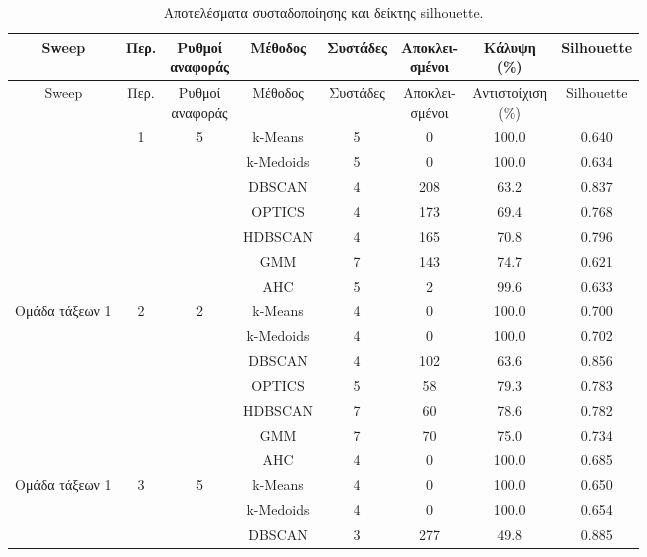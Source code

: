\begingroup
\small
\setlength{\tabcolsep}{3pt}
\setlength{\LTleft}{\fill}
\setlength{\LTright}{\fill}
\begin{longtable}{cccccccc}
\caption{Αποτελέσματα συσταδοποίησης και δείκτης silhouette.}\label{tab:amb:cohesion-coverage}\\
\toprule
Sweep & Περ. & \makecell{Ρυθμοί\\αναφοράς} & Μέθοδος & Συστάδες & \makecell{Αποκλει-\\σμένοι} & \makecell{Κάλυψη\\(\%)} & Silhouette \\
\midrule
\endfirsthead
\toprule
Sweep & Περ. & \makecell{Ρυθμοί\\αναφοράς} & Μέθοδος & Συστάδες & \makecell{Αποκλει-\\σμένοι} & \makecell{Αντιστοίχιση\\(\%)} & Silhouette \\
\midrule
\endhead
\endfoot
\bottomrule
\endlastfoot
\multirow{7}{*}{Ομάδα τάξεων 1} & \multirow{7}{*}{1} & \multirow{7}{*}{5} & k-Means & 5 & 0 & 100.0 & 0.640 \\*
& & & k-Medoids & 5 & 0 & 100.0 & 0.634 \\*
& & & DBSCAN & 4 & 208 & 63.2 & 0.837 \\*
& & & OPTICS & 4 & 173 & 69.4 & 0.768 \\*
& & & HDBSCAN & 4 & 165 & 70.8 & 0.796 \\*
& & & GMM & 7 & 143 & 74.7 & 0.621 \\*
& & & AHC & 5 & 2 & 99.6 & 0.633 \\
\midrule
\multirow{7}{*}{Ομάδα τάξεων 1} & \multirow{7}{*}{2} & \multirow{7}{*}{2} & k-Means & 4 & 0 & 100.0 & 0.700 \\*
& & & k-Medoids & 4 & 0 & 100.0 & 0.702 \\*
& & & DBSCAN & 4 & 102 & 63.6 & 0.856 \\*
& & & OPTICS & 5 & 58 & 79.3 & 0.783 \\*
& & & HDBSCAN & 7 & 60 & 78.6 & 0.782 \\*
& & & GMM & 7 & 70 & 75.0 & 0.734 \\*
& & & AHC & 4 & 0 & 100.0 & 0.685 \\
\midrule
\multirow{7}{*}{Ομάδα τάξεων 1} & \multirow{7}{*}{3} & \multirow{7}{*}{5} & k-Means & 4 & 0 & 100.0 & 0.650 \\*
& & & k-Medoids & 4 & 0 & 100.0 & 0.654 \\*
& & & DBSCAN & 3 & 277 & 49.8 & 0.885 \\*

\end{longtable}
